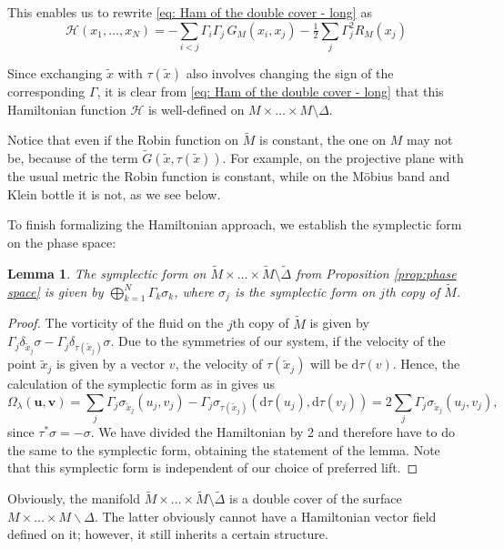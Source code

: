 \documentclass[11pt,twoside]{article}
\newtheorem{lem}[theorem]{Lemma}
\theoremstyle{definition}
\numberwithin{equation}{section}
\def\Mt{\widetilde{M}}
\def\Gt{\widetilde{G}}
\def\xt{\tilde{x}}
\def\d{\mathrm{d}}
\begin{document}
This enables us to rewrite  \eqref{eq: Ham of the double cover - long} as
\begin{equation} \label{eq: Ham of the double cover}
   \mathcal{H}(x_1,\ldots,x_N) =  -\sum_{i< j}\Gamma_i\Gamma_j\,G_M(x_i,x_j)
   	- \tfrac12 \sum_j\Gamma_j^2R_M(x_j)
\end{equation}

Since exchanging $\xt$ with $\tau(\xt)$ also involves changing the sign of the corresponding $\Gamma$, it is clear from \eqref{eq: Ham of the double cover - long} that this Hamiltonian function $\mathcal{H}$ is well-defined on $M\times\dots\times M\setminus\Delta$. 

Notice that even if the Robin function on $\Mt$ is constant, the one on $M$ may not be, because of the term $\Gt(\xt,\tau(\xt))$. For example, on the projective plane with the usual metric the Robin function is constant, while on the M\"obius band and Klein bottle it is not, as we see below.  

To finish formalizing the Hamiltonian approach, we establish the symplectic form on the phase space: 
\begin{lem}
\label{st: symplectic form double cover}
The symplectic form on $\Mt\times\ldots\times\Mt\setminus\widetilde{\Delta}$ from Proposition \ref{prop:phase space} is given by $\bigoplus\limits_{k=1}^N\Gamma_k\sigma_k$, where $\sigma_j$ is the symplectic form on $j$th copy of $\Mt$. 
\end{lem}
\begin{proof}
The vorticity of the fluid on the $j$th copy of $\Mt$ is given by $\Gamma_j\delta_{\xt_j}\sigma - \Gamma_j\delta_{\tau(\xt_j)}\sigma$. Due to the symmetries of our system, if the  velocity of the point $\xt_j$ is given by a vector $v$, the velocity of $\tau(\xt_j)$ will be $\mathrm{d}\tau(v)$. Hence, the calculation of the symplectic form as in \cite{Marsden-Weinstein-Vortices} gives us
\[
\Omega_{\lambda}(\mathbf{u},\mathbf{v}) = \sum_j\Gamma_j\sigma_{\xt_j}(u_j,v_j) - \Gamma_j\sigma_{\tau(\xt_j)}\left(\d\tau(u_j), \d\tau(v_j)\right) = 2\sum_j\Gamma_j\sigma_{\xt_j}(u_j,v_j),
\]
since $\tau^{\ast}\sigma = -\sigma$. We have divided the Hamiltonian by 2 and therefore have to do the same to the symplectic form, obtaining the statement of the lemma. Note that this symplectic form is  independent of our choice of preferred lift.
\end{proof}
Obviously, the manifold $\Mt\times\ldots\times\Mt\setminus\widetilde{\Delta}$ is a double cover of the surface $M\times\ldots\times M\backslash \Delta $. The latter obviously cannot have a Hamiltonian vector field defined on it; however, it still inherits a certain structure. 
\end{document}
